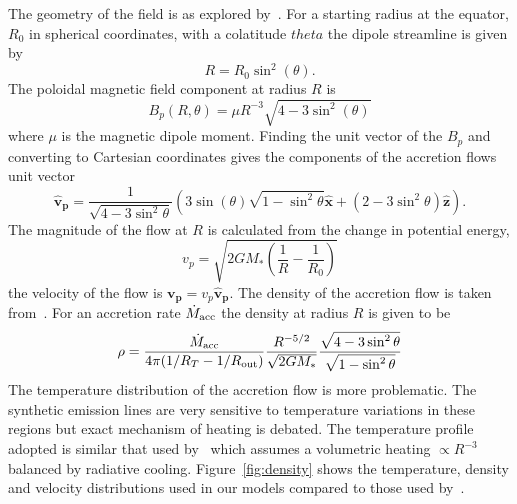 \documentclass[fleqn,usenatbib]{mnras}
\begin{document}
The geometry of the field is as explored by~\citet{1991ApJ...370L..39K,1977ApJ...217..578G}. For a starting radius at the equator, $R_{0}$ in spherical coordinates, with a colatitude $theta$ the dipole streamline is given by
\begin{equation}
    R = R_{0}\sin^{2}(\theta).
\end{equation}
The poloidal magnetic field component at radius $R$ is
\begin{equation}
    B_{p}(R,\theta) = \mu R^{-3}\sqrt{4-3\sin^{2}(\theta )}
\end{equation}
where $\mu$ is the magnetic dipole moment. Finding the unit vector of the $B_p$ and converting to Cartesian coordinates gives the components of the accretion flows unit vector
\begin{equation}
     \mathbf{\hat{v}_p} = \frac{1}{\sqrt{4-3\sin^2\theta}}\left(3\sin(\theta)\sqrt{1-\sin^2\theta}\mathbf{\hat{x}}+(2-3\sin^2\theta)\mathbf{\hat{z}}\right).
\end{equation}
The magnitude of the flow at $R$ is calculated from the change in potential energy,
\begin{equation}
    v_p = \sqrt{2GM_{\ast}(\frac{1}{R} - \frac{1}{R_0})}
\end{equation}
the velocity of the flow is $\mathbf{v_p}=v_p\mathbf{\hat{v}_p}$.
The density of the accretion flow is taken from~\citep{Hartmann:1994tl}. For an accretion rate $\dot{M}_{\rm acc}$ the density at radius $R$ is given to be
\begin{equation}
    \rho = \frac{\dot{M}_{\rm acc}}{4\pi(1/R_T - 1/R_{\rm out})}\frac{R^{-5/2}}{\sqrt{2GM_{\ast}}}\frac{\sqrt{4-3\sin^2\theta}}{\sqrt{1-\sin^2\theta}}
\end{equation}
The temperature distribution of the accretion flow is more problematic. The synthetic emission lines are very sensitive to temperature variations in these regions but exact mechanism of heating is debated. The temperature profile adopted is similar that used by~\citet{Hartmann:1994tl,1998ApJ...492..743M} which assumes a volumetric heating $\propto R^{-3}$ balanced by radiative cooling. Figure~\ref{fig:density} shows the temperature, density and velocity distributions used in our models compared to those used by~\citet{1998ApJ...492..743M}.
\end{document}
